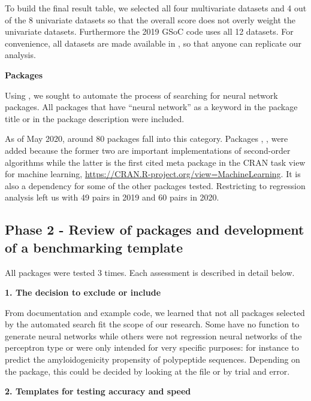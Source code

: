 To build the final result table, we selected all four multivariate
datasets and 4 out of the 8 univariate datasets so that the overall
score does not overly weight the univariate datasets. Furthermore the
2019 GSoC code uses all 12 datasets. For convenience, all datasets are
made available in , so that anyone can replicate
our analysis.

\textbf{Packages}

Using  \citep{R-RWsearch}, we sought to automate the
process of searching for neural network packages. All packages that have
``neural network'' as a keyword in the package title or in the package
description were included.

As of May 2020, around 80 packages fall into this category. Packages
, ,  were added because the former
two are important implementations of second-order algorithms while the
latter is the first cited meta package in the CRAN task view for machine
learning, \url{https://CRAN.R-project.org/view=MachineLearning}. It is
also a dependency for some of the other packages tested. Restricting to
regression analysis left us with 49  pairs in
2019 and 60  pairs in 2020.

\hypertarget{phase-2---review-of-packages-and-development-of-a-benchmarking-template}{%
\subsection{Phase 2 - Review of packages and development of a
benchmarking
template}\label{phase-2---review-of-packages-and-development-of-a-benchmarking-template}}

All packages were tested 3 times. Each assessment is described in detail
below.

\textbf{1. The decision to exclude or include}

From documentation and example code, we learned that not all packages
selected by the automated search fit the scope of our research. Some
have no function to generate neural networks while others were not
regression neural networks of the perceptron type or were only intended
for very specific purposes: for instance to predict the amyloidogenicity
propensity of polypeptide sequences. Depending on the package, this
could be decided by looking at the  file or by trial
and error.

\textbf{2. Templates for testing accuracy and speed}

